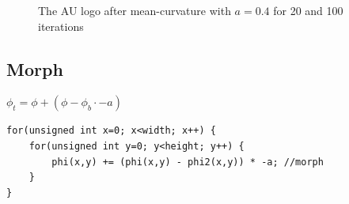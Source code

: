 \begin{figure}[h]
  \centering
  \caption{The AU logo after mean-curvature with $a=0.4$ for 20 and 100 iterations}
  \label{fig:auMean}
\end{figure}




\subsection{Morph}


$\phi_t = \phi + (\phi - \phi_b \cdot -a)$

\begin{lstlisting}
for(unsigned int x=0; x<width; x++) {
    for(unsigned int y=0; y<height; y++) {
        phi(x,y) += (phi(x,y) - phi2(x,y)) * -a; //morph
    }
}
\end{lstlisting}



